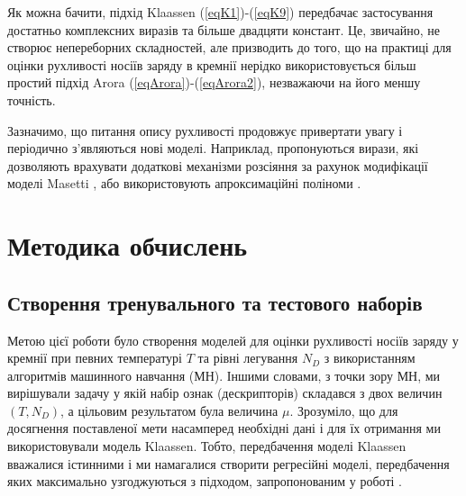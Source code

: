 \documentclass[12pt,a4paper,titlepage,oneside]{book}
\numberwithin{equation}{part}
\begin{document}
Як можна бачити, підхід Klaassen (\ref{eqK1})-(\ref{eqK9}) передбачає застосування достатньо комплексних виразів та більше двадцяти констант.
Це, звичайно, не створює непереборних складностей, але призводить до того, що на практиці для оцінки рухливості носіїв заряду в кремнії нерідко використовується більш простий
підхід Arora (\ref{eqArora})-(\ref{eqArora2}), незважаючи на його меншу точність.

Зазначимо, що питання опису рухливості продовжує привертати увагу і періодично з'являються нові моделі.
Наприклад, пропонуються вирази, які дозволяють врахувати додаткові механізми розсіяння за рахунок модифікації моделі Masetti \cite{Cummings2010},
або використовують апроксимаційні поліноми \cite{NoorMohammad1993}.


\chapter{Методика обчислень}

\section{Створення тренувального та тестового наборів}

Метою цієї роботи було створення моделей для оцінки рухливості носіїв заряду у кремнії
при певних температурі $T$ та рівні легування $N_D$ з використанням алгоритмів машинного навчання (МН).
Іншими словами, з точки зору МН, ми вирішували задачу у якій набір ознак (дескрипторів) складався з двох величин $(T,N_D)$,
а цільовим результатом була величина $\mu$.
Зрозуміло, що для досягнення поставленої мети насамперед необхідні дані і для їх отримання ми використовували модель Klaassen.
Тобто, передбачення  моделі Klaassen вважалися істинними і ми намагалися створити регресійні моделі,
передбачення яких максимально узгоджуються з підходом, запропонованим у роботі \cite{KLAASSEN953}.
\end{document}
